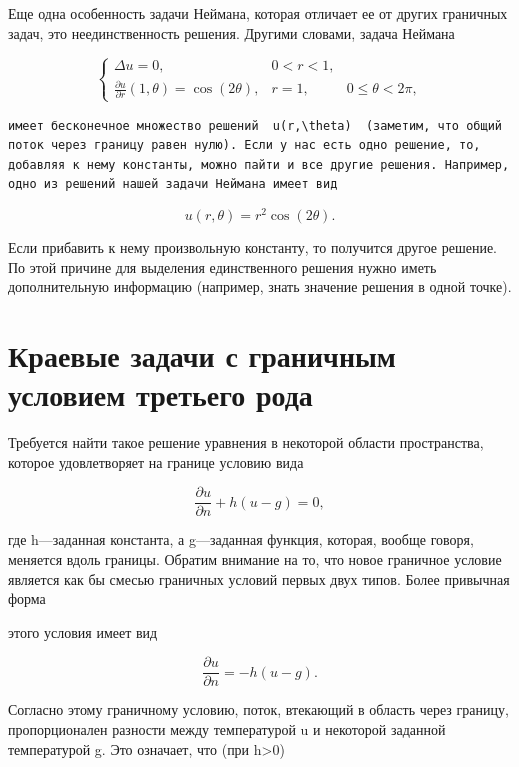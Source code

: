 \documentclass[
  ukrainian,
]{article}
\begin{document}
Еще одна особенность задачи Неймана, которая отличает ее от других
граничных задач, это неединственность решения. Другими словами, задача
Неймана

\[
\begin{cases} \Delta u = 0, & 0 < r < 1, \\ \frac{\partial u}{\partial r}(1, \theta) = \cos(2\theta), & r = 1, & 0 \le \theta < 2\pi, \end{cases}
\]

\begin{verbatim}
имеет бесконечное множество решений  u(r,\theta)  (заметим, что общий поток через границу равен нулю). Если у нас есть одно решение, то, добавляя к нему константы, можно пайти и все другие решения. Например, одно из решений нашей задачи Неймана имеет вид
\end{verbatim}

\[
u(r,\theta)=r^2\cos{(2\theta)}.
\]

Если прибавить к нему произвольную константу, то получится другое
решение. По этой причине для выделения единственного решения нужно иметь
дополнительную информацию (например, знать значение решения в одной
точке).

\section{\texorpdfstring{\textbf{Краевые задачи с граничным условием}
третьего
рода}{Краевые задачи с граничным условием третьего рода}}\label{ux43aux440ux430ux435ux432ux44bux435-ux437ux430ux434ux430ux447ux438-ux441-ux433ux440ux430ux43dux438ux447ux43dux44bux43c-ux443ux441ux43bux43eux432ux438ux435ux43c-ux442ux440ux435ux442ux44cux435ux433ux43e-ux440ux43eux434ux430}

Требуется найти такое решение уравнения в некоторой области
пространства, которое удовлетворяет на границе условию вида

\[
\frac{\partial u}{\partial n} + h (u - g) = 0,
\]

где h---заданная константа, а g---заданная функция, которая, вообще
говоря, меняется вдоль границы. Обратим внимание на то, что новое
граничное условие является как бы смесью граничных условий первых двух
типов. Более привычная форма

этого условия имеет вид

\[
\frac{\partial u}{\partial n} = -h (u - g).
\]

Согласно этому граничному условию, поток, втекающий в область через
границу, пропорционален разности между температурой u и некоторой
заданной температурой g. Это означает, что (при h\textgreater0)
\end{document}
